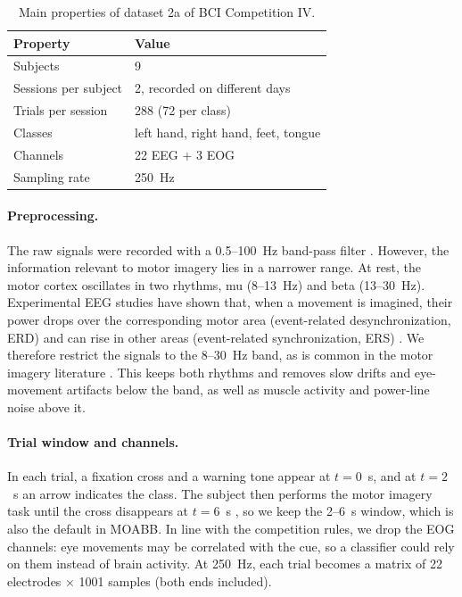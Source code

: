 \begin{table}[htbp]
  \centering
  \caption{Main properties of dataset 2a of BCI Competition IV.}
  \label{tab:dataset}
  \begin{tabular}{ll}
    \toprule
    Property & Value \\
    \midrule
    Subjects & 9 \\
    Sessions per subject & 2, recorded on different days \\
    Trials per session & 288 (72 per class) \\
    Classes & left hand, right hand, feet, tongue \\
    Channels & 22 EEG + 3 EOG \\
    Sampling rate & 250~Hz \\
    \bottomrule
  \end{tabular}
\end{table}

\paragraph{Preprocessing.}
The raw signals were recorded with a 0.5--100~Hz band-pass filter \citep{brunner2008}. However, the information relevant to motor imagery lies in a narrower range. At rest, the motor cortex oscillates in two rhythms, mu (8--13~Hz) and beta (13--30~Hz). Experimental EEG studies have shown that, when a movement is imagined, their power drops over the corresponding motor area (event-related desynchronization, ERD) and can rise in other areas (event-related synchronization, ERS) \citep{pfurtscheller1999, pfurtscheller2006}. We therefore restrict the signals to the 8--30~Hz band, as is common in the motor imagery literature \citep{barachant2012}. This keeps both rhythms and removes slow drifts and eye-movement artifacts below the band, as well as muscle activity and power-line noise above it.

\paragraph{Trial window and channels.}
In each trial, a fixation cross and a warning tone appear at $t = 0$~s, and at $t = 2$~s an arrow indicates the class. The subject then performs the motor imagery task until the cross disappears at $t = 6$~s \citep{brunner2008}, so we keep the 2--6~s window, which is also the default in MOABB. In line with the competition rules, we drop the EOG channels: eye movements may be correlated with the cue, so a classifier could rely on them instead of brain activity. At 250~Hz, each trial becomes a matrix of 22 electrodes $\times$ 1001 samples (both ends included).

